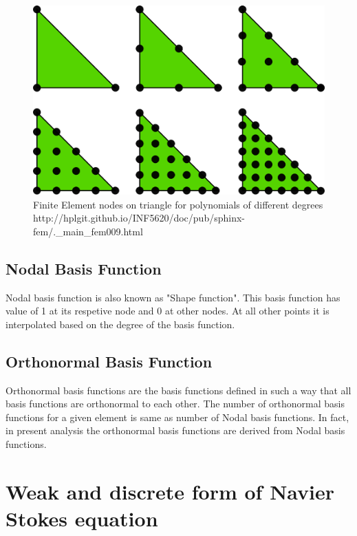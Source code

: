 \documentclass[a4paper,10pt]{book}
\begin{document}
\begin{figure}
  \includegraphics[width=\linewidth]{fem_triangle_2.png}
  \caption{Finite Element nodes on triangle for polynomials of different degrees \\ http://hplgit.github.io/INF5620/doc/pub/sphinx-fem/.\_main\_fem009.html}
  \label{fig:Nodes on Triangular Element}
\end{figure}

\subsection{Nodal Basis Function}

Nodal basis function is also known as "Shape function". This basis function has value of 1 at its respetive node and 0 at other nodes. At all other points it is interpolated based on the degree of the basis function. 

\subsection{Orthonormal Basis Function}

Orthonormal basis functions are the basis functions defined in such a way that all basis functions are orthonormal to each other. The number of orthonormal basis functions for a given element is same as number of Nodal basis functions. In fact, in present analysis the orthonormal basis functions are derived from Nodal basis functions.

\newpage
\section{Weak and discrete form of Navier Stokes equation}
\end{document}
